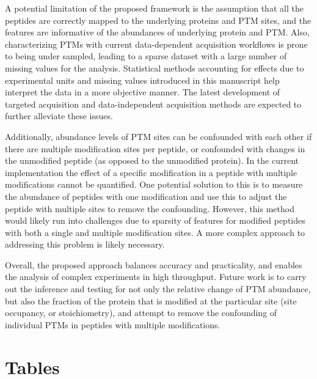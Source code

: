 \documentclass[mcp]{article}
\numberwithin{table}{section}
\begin{document}
A potential limitation of the proposed framework is the assumption that all the peptides are correctly mapped to the underlying proteins and PTM sites, and the features are informative of the abundances of underlying protein and PTM. Also, characterizing PTMs with current data-dependent acquisition workflows is prone to being under sampled, leading to a sparse dataset with a large number of missing values for the analysis. Statistical methods accounting for effects due to experimental units and missing values introduced in this manuscript help interpret the data in a more objective manner. The latest development of targeted acquisition and data-independent acquisition methods are expected to further alleviate these issues. 

Additionally, abundance levels of PTM sites can be confounded with each other if there are multiple modification sites per peptide, or confounded with changes in the unmodified peptide (as opposed to the unmodified protein). In the current implementation the effect of a specific modification in a peptide with multiple modifications cannot be quantified. One potential solution to this is to measure the abundance of peptides with one modification and use this to adjust the peptide with multiple sites to remove the confounding. However, this method would likely run into challenges due to sparsity of features for modified peptides with both a single and multiple modification sites. A more complex approach to addressing this problem is likely necessary.

Overall, the proposed approach balances accuracy and practicality, and enables the analysis of complex experiments in high throughput. Future work is to carry out the inference and testing for not only the relative change of PTM abundance, but also the fraction of the protein that is modified at the particular site (site occupancy, or stoichiometry), and attempt to remove the confounding of individual PTMs in peptides with multiple modifications.

\newpage
\printbibliography


\newpage
\section{Tables}
\end{document}

